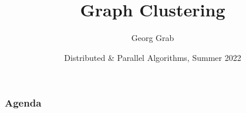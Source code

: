 \documentclass[dvisvgm,hypertex,aspectratio=169]{beamer}
\title[Graph Clustering]{Graph Clustering}
\author[Georg Grab]{Georg Grab}
\institute[Heidelberg University]{Heidelberg University}
\date{Distributed \& Parallel Algorithms, Summer 2022}
\begin{document}
\frame{\titlepage}

\begin{frame}
\frametitle{Agenda}
\tableofcontents
\end{frame}







\end{document}
